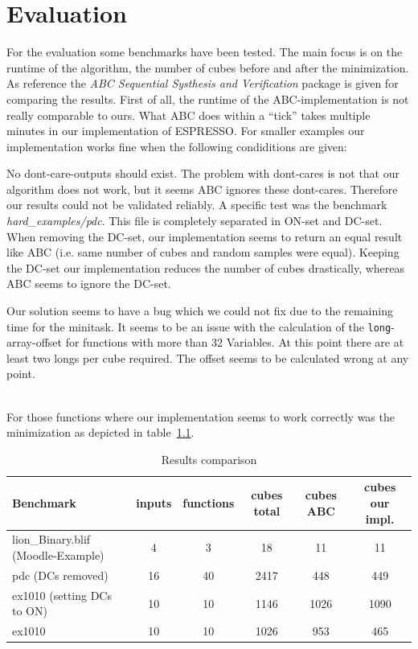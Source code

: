 \documentclass[colorback,accentcolor=tud1c,11pt]{tudreport}
\newcommand\code[1]{\texttt{#1}}
\begin{document}
 \chapter{Evaluation}
 For the evaluation some benchmarks have been tested. The main focus is on the runtime of the algorithm, the number of cubes before and after the minimization. As reference the \textit{ABC Sequential Systhesis and Verification} package is given for comparing the results. First of all, the runtime of the ABC-implementation is not really comparable to ours. What ABC does within a ``tick'' takes multiple minutes in our implementation of ESPRESSO. For smaller examples our implementation works fine when the following condiditions are given:
 \begin{itemize}
  \begin{item}
  No dont-care-outputs should exist. The problem with dont-cares is not that our algorithm does not work, but it seems ABC ignores these dont-cares. Therefore our results could not be validated reliably. A specific test was the benchmark \textit{hard\_examples/pdc}. This file is completely separated in ON-set and DC-set. When removing the DC-set, our implementation seems to return an equal result like ABC (i.e. same number of cubes and random samples were equal). Keeping the DC-set our implementation reduces the number of cubes drastically, whereas ABC seems to ignore the DC-set.
  \end{item}
  \begin{item}
  Our solution seems to have a bug which we could not fix due to the remaining time for the minitask. It seems to be an issue with the calculation of the \code{long}-array-offset for functions with more than 32 Variables. At this point there are at least two longs per cube required. The offset seems to be calculated wrong at any point.
  \end{item}
\\
  For those functions where our implementation seems to work correctly was the minimization as depicted in table~\ref{tbl:foobar}.

  \begin{table}
    \center
    \begin{tabular} { | l | c | c | c | c | c |}
      \hline
      \textbf{Benchmark} & inputs & functions &  cubes total & cubes ABC &  cubes our impl. \\
      \hline
      lion\_Binary.blif (Moodle-Example) & 4 & 3 & 18 & 11 & 11 \\
      pdc (DCs removed) & 16 & 40 & 2417 & 448 & 449 \\
      ex1010 (setting DCs to ON) & 10 & 10 & 1146 & 1026 & 1090 \\
      ex1010 & 10 & 10 & 1026 & 953 & 465 \\
      \hline
    \end{tabular}
    \caption{Results comparison}
    \label{tbl:foobar}
  \end{table}

 \end{itemize}
 
\end{document}
